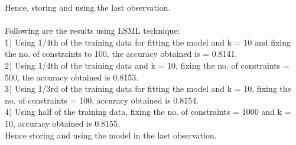 \documentclass[a4paper,11pt]{article}
\begin{document}
\begin{mlsolution}
Hence, storing and using the last observation.\\\\

Following are the results using LSML technique:\\

1) Using  1/4th of the training data for fitting the model and k = 10 and fixing the no. of constraints to 100, the accuracy obtained is =  0.8141. \\

2) Using 1/4th of the training data and k = 10, fixing the no. of constraints = 500, the accuracy obtained is 0.8153. \\

3) Using 1/3rd of the training data for fitting the model and k = 10, fixing the no. of constraints = 100, accuracy obtained is 0.8154.\\

4) Using half of the training data, fixing the no. of constraints = 1000 and k = 10, accuracy obtained is 0.8155.\\

Hence storing and using the model in the last observation.

\end{mlsolution}
\end{document}
